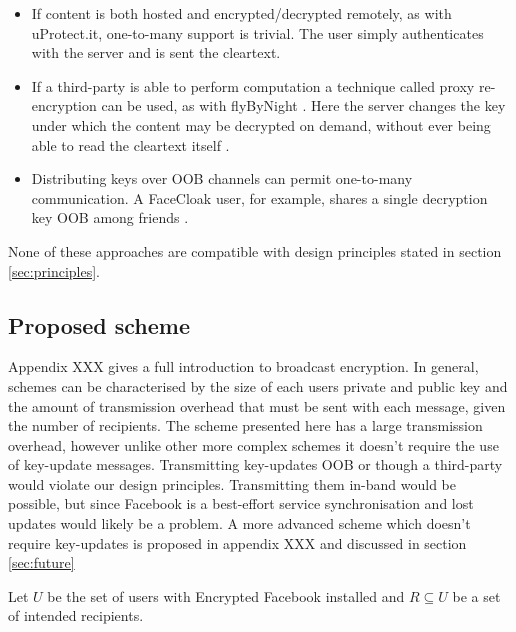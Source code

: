 \begin{itemize}

    \item If content is both hosted and encrypted/decrypted remotely, as with uProtect.it, one-to-many support is trivial. The user simply authenticates with the server and is sent the cleartext.
    
    \item If a third-party is able to perform computation a technique called proxy re-encryption can be used, as with flyByNight \cite{flybynight}. Here the server changes the key under which the content may be decrypted on demand, without ever being able to read the cleartext itself \cite{proxy}.
    
    \item Distributing keys over OOB channels can permit one-to-many communication. A FaceCloak user, for example, shares a single decryption key OOB among friends \cite{facecloak}.

\end{itemize}

None of these approaches are compatible with design principles stated in section \ref{sec:principles}.


\FloatBarrier
\subsection{Proposed scheme}

Appendix XXX gives a full introduction to broadcast encryption. In general, schemes can be characterised by the size of each users private and public key and the amount of transmission overhead that must be sent with each message, given the number of recipients. The scheme presented here has a large transmission overhead, however unlike other more complex schemes it doesn't require the use of key-update messages. Transmitting key-updates OOB or though a third-party would violate our design principles. Transmitting them in-band would be possible, but since Facebook is a best-effort service synchronisation and lost updates would likely be a problem. A more advanced scheme which doesn't require key-updates is proposed in appendix XXX and discussed in section \ref{sec:future}

Let $U$ be the set of users with Encrypted Facebook installed and $R \subseteq U$ be a set of intended recipients.



